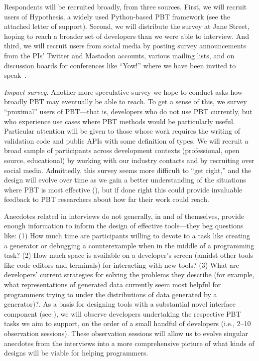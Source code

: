 Respondents will
be recruited broadly, from three sources. First, we will recruit
users of Hypothesis, a widely used Python-based PBT
framework
(see the attached letter of support).
Second, we will distribute the survey at Jane Street, hoping to reach
a broader set of developers than we were able to interview.
And third, we will recruit users from social media by posting
survey announcements from the PIs' Twitter and Mastodon
accounts, various mailing lists, and on discussion boards for conferences like
``Yow!'' where we have been invited to speak~\cite{noauthor_when_nodate}.

\emph{Impact survey}. Another more speculative survey we hope to conduct asks
how broadly PBT may eventually be able to reach.  To get a sense of this, we
survey ``proximal'' users of PBT---that is, developers who do not use PBT
currently, but who experience use cases where PBT methods would be particularly
useful.  Particular attention will be given to those whose work requires the
writing of validation code and public APIs with some definition of types. We
will recruit a broad sample of participants across development contexts
(professional, open source, educational) by working with our industry contacts
and by recruiting over social media. Admittedly, this survey seems more
difficult to ``get right,'' and the design will evolve over time as we gain a
better understanding of the situations where PBT is most effective
(), but if done right this could provide invaluable
feedback to PBT researchers about how far their work could reach.


Anecdotes related in interviews do not generally, in and of
themselves, provide enough information to inform the design of
effective tools---they beg questions like: (1) How much time
are participants willing to devote to
a task like creating a generator or debugging a counterexample when in the
middle of a programming task? (2) How much space is available on a developer's
screen (amidst other tools like code editors and terminals) for
interacting with new
tools? (3) What are developers' current strategies for solving the
problems they describe
(for example, what representations of generated data currently seem most helpful
for programmers trying to under the distributions of data generated by a
generator)?.  As a basis for designing tools with a substantial novel interface
component (see ), we will observe developers
undertaking the respective PBT tasks we
aim to support, on the order of a small handful of developers (i.e., 2--10
observation sessions). These observation sessions will allow us to evolve
singular anecdotes from the interviews into a more comprehensive picture of
what kinds of designs will be viable for helping programmers.

